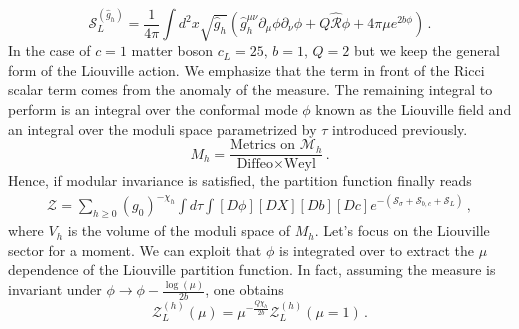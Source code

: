 \documentclass[a4paper]{article}
\begin{document}
\begin{equation}
  \mathcal{S}^{(\hat{g}_h)}_{L}=\frac{1}{4\pi}\int d^2x \sqrt{\hat{g}_h}\left(\hat{g}^{\mu \nu}_h \partial_\mu \phi \partial_\nu \phi +Q \hat{\mathcal{R}}\phi+4\pi\mu e^{2b\phi}\right)\,.
\end{equation}
In the case of $c=1$ matter boson $c_L=25,\,b=1,\,Q=2$ but we keep the general form of the Liouville action. We emphasize that the term in front of the Ricci scalar term comes from the anomaly of the measure. The remaining integral to perform is an integral over the conformal mode $\phi$ known as the Liouville field and an integral over the moduli space parametrized by $\tau$ introduced previously.
\begin{equation}
  M_{h}=\frac{\text{Metrics on }\mathcal{M}_h}{\text{Diffeo} \times \text{Weyl}}\,.
\end{equation}
Hence, if modular invariance is satisfied, the partition function finally reads
\begin{equation}\label{eq:finalgaugefixing}
  \begin{aligned}
    \mathcal{Z} = \sum _{h\geq0} (g_0)^{-\chi_h} \int d\tau \int [D\phi][DX][Db][Dc]e^{-(\mathcal{S}_{\sigma}+\mathcal{S}_{b,c}+\mathcal{S}_{L})}\,,
  \end{aligned}
\end{equation}
where $V_{h}$ is the volume of the moduli space of $M_h$. Let's focus on the Liouville sector for a moment. We can exploit that $\phi$ is integrated over to extract the $\mu$ dependence of the Liouville partition function. In fact, assuming the measure is invariant under $\phi \rightarrow \phi -\frac{\log(\mu)}{2b}$, one obtains
\begin{equation}\label{eq:KPZ}
  \mathcal{Z}^{(h)}_L(\mu) = \mu^{-\frac{Q\chi_h}{2b}}\mathcal{Z}^{(h)}_L(\mu = 1)\,.
\end{equation}
\end{document}
